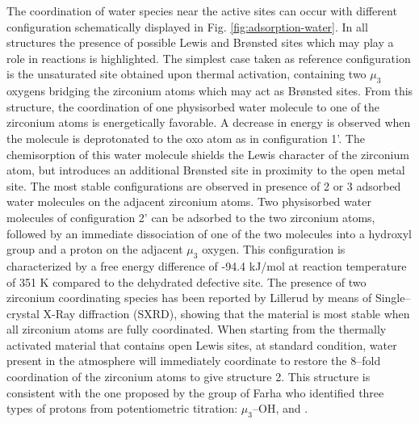 \npar
The coordination of water species near the active sites can occur with different configuration schematically displayed in Fig. \ref{fig:adsorption-water}. In all structures the presence of possible Lewis and Br\o{}nsted sites which may play a role in reactions is highlighted. The simplest case taken as reference configuration is the unsaturated site obtained upon thermal activation, containing two $\mu_3$ oxygens bridging the zirconium atoms which may act as Br\o{}nsted sites. From this structure, the coordination of one physisorbed water molecule to one of the zirconium atoms is energetically favorable. A decrease in energy is observed when the molecule is deprotonated to the oxo atom as in configuration 1’. The chemisorption of this water molecule shields the Lewis character of the zirconium atom, but introduces an additional Br\o{}nsted site in proximity to the open metal site. 
\npar
The most stable configurations are observed in presence of 2 or 3 adsorbed water molecules on the adjacent zirconium atoms. Two physisorbed water molecules of configuration 2’ can be adsorbed to the two zirconium atoms, followed by an immediate dissociation of one of the two molecules into a hydroxyl group and a proton on the adjacent $\mu_3$ oxygen. This configuration is characterized by a free energy difference of -94.4 kJ/mol at reaction temperature of 351 K compared to the dehydrated defective site. The presence of two zirconium coordinating species has been reported by Lillerud \cite{oien2014detailed} by means of Single--crystal X-Ray diffraction (SXRD), showing that the material is most stable when all zirconium atoms are fully coordinated. When starting from the thermally activated material that contains open Lewis sites, at standard condition, water present in the atmosphere will immediately coordinate to restore the 8--fold coordination of the zirconium atoms to give structure 2. This structure is consistent with the one proposed by the group of Farha \cite{klet2016evaluation} who identified three types of protons from potentiometric titration: $\mu_3$--OH,  and . 
\npar
